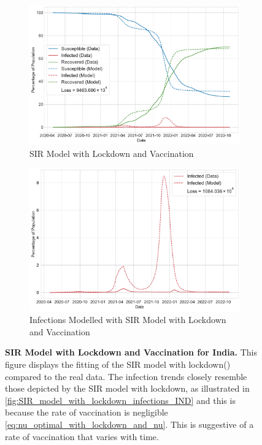 \documentclass[tikz,fleqn,12pt]{wlscirep}
\begin{document}
\begin{figure}[htbp!]
  \centering
  \begin{subfigure}[t]{\textwidth}
    \centering
    \includegraphics[scale=0.50]{images/SIR_model_with_lockdown_with_vaccination_IND.pdf}
    \caption{SIR Model with Lockdown and Vaccination}
    \label{fig:SIR_model_with_lockdown_with_vaccination_IND}
  \end{subfigure}

  \begin{subfigure}[t]{\textwidth}
    \centering
    \includegraphics[scale=0.50]{images/SIR_model_with_lockdown_with_vaccination_infections_IND.pdf}
    \caption{Infections Modelled with SIR Model with Lockdown and Vaccination}
    \label{fig:SIR_model_with_lockdown_with_vaccination_infections_IND}
  \end{subfigure}
  \caption{\textbf{SIR Model with Lockdown and Vaccination for India.} This figure displays the fitting of the SIR model with lockdown() compared to the real data. The infection trends closely resemble those depicted by the SIR model with lockdown, as illustrated in \cref{fig:SIR_model_with_lockdown_infections_IND} and this is because the rate of vaccination is negligible \cref{eq:nu_optimal_with_lockdown_and_nu}. This is suggestive of a rate of vaccination that varies with time.}
\end{figure}
\end{document}
